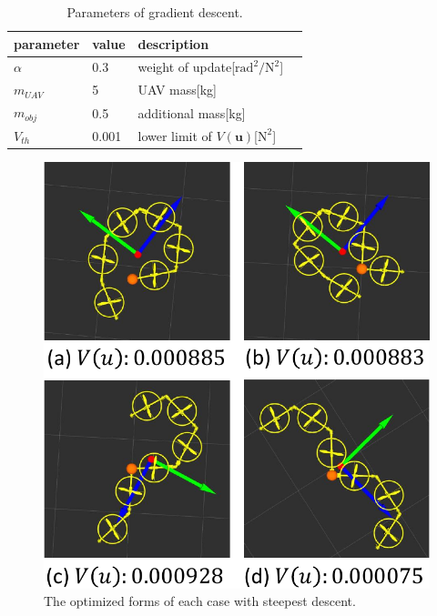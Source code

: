 \begin{table}[tb]
 \caption{Parameters of gradient descent.}
 \label{table:optimization_params}
 \centering
 \begin{tabular}{|p{}|l|l|l|}
  \hline
  parameter & value & description \\ \hline \hline
  $\alpha$ & 0.3 & weight of update[$\text{rad}^2/\text{N}^2$]\\
  $m_{UAV}$ & 5 & UAV mass[kg]\\
  $m_{obj}$ & 0.5 & additional mass[kg]\\
  $V_{th}$ & 0.001 & lower limit of $V(\bm{u})$[$\text{N}^2$]\\
  \hline
 \end{tabular}
\end{table}

\begin{figure}[t]
  \begin{center}
    \includegraphics[width=0.8\columnwidth]{figs/optimization_result.pdf}
    \caption{The optimized forms of each case with steepest descent.\label{figure:optimization_result}}
  \end{center}
  
\end{figure}
